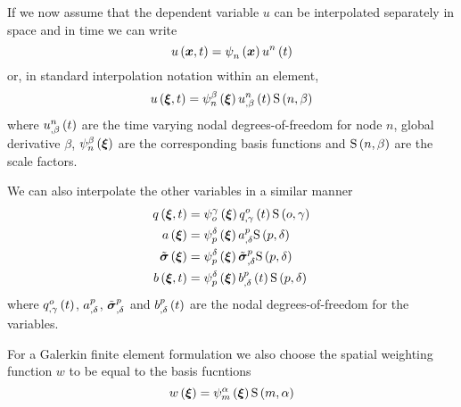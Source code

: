 If we now assume that the dependent variable $u$ can be interpolated
separately in space and in time we can write
\begin{equation}
   u\left( \boldsymbol{x},t \right) =   \psi_{n}^{} \left( \boldsymbol{x} \right)    {u}^{n} \left( t \right) 
\end{equation}
or, in standard interpolation notation within an element,
\begin{equation}
   u\left( \boldsymbol{\xi},t \right) =   \psi_{n}^{\beta} \left( \boldsymbol{\xi} \right)  
     {u}^{n} _{,\beta} \left( t \right)    \mathrm{S} \left( n,\beta \right)  
\end{equation}
where $   {u}^{n} _{,\beta} \left( t \right) $ are the time varying nodal
degrees-of-freedom for node $n$, global derivative $\beta$,
$   \psi_{n}^{\beta} \left( \boldsymbol{\xi} \right)  $ are the corresponding basis functions 
and $   \mathrm{S} \left( n,\beta \right)  $ are the scale factors. 

We can also interpolate the other variables in a similar manner \ie
\begin{equation}
  \begin{split}
     q\left( \boldsymbol{\xi},t \right)  &=    \psi_{o}^{\gamma} \left( \boldsymbol{\xi} \right)  
       {q}^{o} _{,\gamma} \left( t \right)    \mathrm{S} \left( o,\gamma \right)   \\
     a\left( \boldsymbol{\xi} \right)  &=   \psi_{p}^{\delta} \left( \boldsymbol{\xi} \right)  
      {a}^{p} _{,\delta}    \mathrm{S} \left( p,\delta \right)   \\
     \tilde{\boldsymbol{\mathit{\sigma}}}\left( \boldsymbol{\xi} \right) 
    &=   \psi_{p}^{\delta} \left( \boldsymbol{\xi} \right)    {\tilde{\boldsymbol{\mathit{\sigma}}}}^{p} _{,\delta} 
       \mathrm{S} \left( p,\delta \right)   \\
     b\left( \boldsymbol{\xi},t \right)  &=
       \psi_{p}^{\delta} \left( \boldsymbol{\xi} \right)     {b}^{p} _{,\delta} \left( t \right)    \mathrm{S} \left( p,\delta \right)  
  \end{split}
\end{equation}
where $   {q}^{o} _{,\gamma} \left( t \right) $, $  {a}^{p} _{,\delta} $,
$  {\tilde{\boldsymbol{\mathit{\sigma}}}}^{p} _{,\delta} $ and 
$   {b}^{p} _{,\delta} \left( t \right) $ are the
nodal degrees-of-freedom for the variables.

For a Galerkin finite element formulation we also choose the spatial weighting
function $w$ to be equal to the basis fucntions \ie
\begin{equation}
   w\left( \boldsymbol{\xi} \right) =   \psi_{m}^{\alpha} \left( \boldsymbol{\xi} \right)     \mathrm{S} \left( m,\alpha \right)  
\end{equation}


